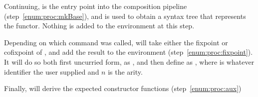 Continuing,  is the entry point into the composition pipeline (step~\ref{enum:proc:mkBase}), and is used to obtain a syntax tree that represents the  functor.
Nothing is added to the environment at this step.

Depending on which command was called,  will take either the fixpoint or cofixpoint of , and
add the result to the environment (step~\ref{enum:proc:fixpoint}). It will do so both first uncurried form, as , and
then define  as , where  is whatever identifier the
user supplied and $n$ is the arity.

Finally,  will derive the expected constructor functions (step~\ref{enum:proc:aux})


  
  
  
  




